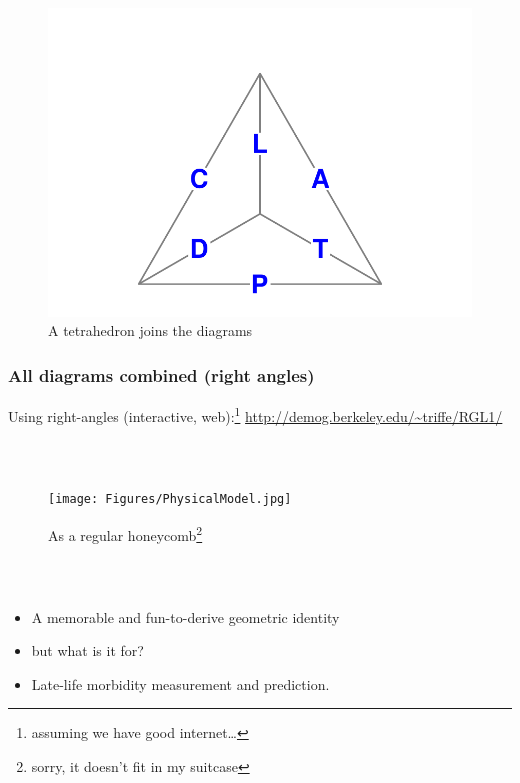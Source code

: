 \documentclass[20pt]{beamer}
\begin{document}
\begin{frame}
\frametitle{~}
\begin{figure}[b]
    \centering
    \caption{A tetrahedron joins the diagrams}
    \includegraphics{Figures/Tetra1prg.pdf}
    \end{figure}
\end{frame}

\begin{frame}
\frametitle{All diagrams combined (right angles)}
Using right-angles (interactive, web):\footnote{assuming we have good
internet\ldots}
\url{http://demog.berkeley.edu/~triffe/RGL1/}

\end{frame}

\begin{frame}
\frametitle{~}

\begin{figure}[b]
    \centering
    \caption{As a regular honeycomb\footnote{sorry, it doesn't fit in my
    suitcase}}
    \texttt{[image: Figures/PhysicalModel.jpg]}
    \end{figure}
\end{frame}

\begin{frame}
\frametitle{~}
\begin{itemize}
  \item<1-> A memorable and fun-to-derive geometric identity
  \item<2-> but what is it for?
  \item<3-> Late-life morbidity measurement and prediction.
\end{itemize}
\end{frame}
\end{document}
